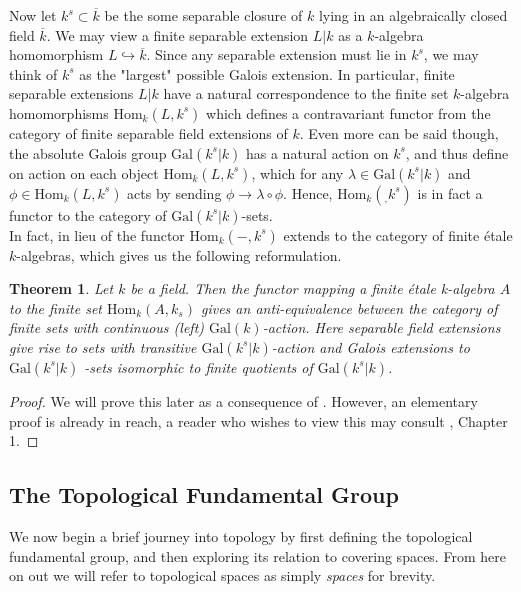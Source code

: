 \documentclass{article}
\newtheorem{theorem}{Theorem}[section]
\theoremstyle{definition}
\theoremstyle{remark}
\theoremstyle{plain}
\begin{document}
Now let $k^s \subset \overline{k}$ be the some separable closure of $k$ lying in an algebraically closed field $\overline{k}$.
We may view a finite separable extension $L|k$ as a $k$-algebra homomorphism $L \hookrightarrow \overline{k}$. Since any separable extension must lie in $k^s$, we may think of $k^s$ as the "largest" possible Galois extension.
In particular, finite separable extensions $L|k$ have a natural correspondence to the finite set $k$-algebra homomorphisms $\text{Hom}_k(L, k^s)$
 which defines a contravariant functor from the category of finite separable field extensions of $k$.
 Even more can be said though, the absolute Galois group $\text{Gal}(k^s|k)$ has a natural action on $k^s$, and thus define on action on each object $\text{Hom}_k(L, k^s)$, which for any $\lambda \in \text{Gal}(k^s|k)$ and $\phi \in \text{Hom}_k(L, k^s)$ acts by sending $\phi \to \lambda \circ \phi$.
 Hence, $\text{Hom}_k(_, k^s)$ is in fact a functor to the category of $\text{Gal}(k^s|k)$-sets.\\
\indent In fact, in lieu of  the functor $\text{Hom}_k(-,k^s)$ extends to the category of finite \'etale $k$-algebras, which gives us the following reformulation.

\begin{theorem}
	Let $k$ be a field. 
	Then the functor mapping a finite \'etale k-algebra $A$ to the finite set $\text{Hom}_k(A, k_s)$ gives an anti-equivalence between the category of finite sets with continuous (left) $\text{Gal}(k)$-action.
	Here separable field extensions give rise to sets with transitive $\text{Gal}(k^s|k)$-action and Galois extensions to $\text{Gal}(k^s|k)$ -sets isomorphic to finite quotients of $\text{Gal}(k^s|k)$.
\end{theorem}

\begin{proof}
	We will prove this later as a consequence of . 
	However, an elementary proof is already in reach, a reader who wishes to view this may consult \cite{Szamuely}, Chapter 1.
\end{proof}

\subsection{The Topological Fundamental Group}
We now begin a brief journey into topology by first defining the topological fundamental group, and then exploring its relation to covering spaces.
From here on out we will refer to topological spaces as simply \textit{spaces} for brevity.
\end{document}
